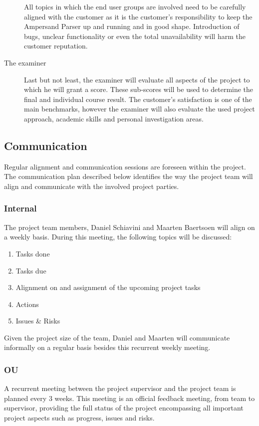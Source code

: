 \begin{description}
	All topics in which the end user groups are involved need to be carefully aligned with the customer as it is the customer's responsibility to keep the Ampersand Parser up and running and in good shape.
	Introduction of bugs, unclear functionality or even the total unavailability will harm the customer reputation.

	\item[The examiner]
	Last but not least, the examiner will evaluate all aspects of the project to which he will grant a score.
	These sub-scores will be used to determine the final and individual course result.
	The customer's satisfaction is one of the main benchmarks, however the examiner will also evaluate the used project approach, academic skills and personal investigation areas.
\end {description}

\subsection{Communication}
\label{subsec:communication}
Regular alignment and communication sessions are foreseen within the project.
The communication plan described below identifies the way the project team will align and communicate with the involved project parties.

\subsubsection{Internal}
The project team members, Daniel Schiavini and Maarten Baertsoen will align on a weekly basis.
During this meeting, the following topics will be discussed:
\begin{enumerate}
	\item Tasks done
	\item Tasks due
	\item Alignment on and assignment of the upcoming project tasks
	\item Actions
	\item Issues \& Risks
\end {enumerate}
%
Given the project size of the team, Daniel and Maarten will communicate informally on a regular basis besides this recurrent weekly meeting.

\subsubsection{OU}
%
A recurrent meeting between the project supervisor and the project team is planned every 3 weeks.
This meeting is an official feedback meeting, from team to supervisor, providing the full status of the project encompassing all important project aspects such as progress, issues and risks.

